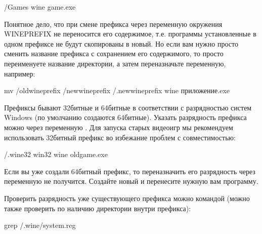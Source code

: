 \documentclass[letterpaper,10pt,russian,openany]{sphinxmanual}
\begin{document}
\begin{sphinxVerbatim}[commandchars=\\\{\}]
\PYGZti{}/Games wine game.exe 
\end{sphinxVerbatim}

\sphinxAtStartPar
Понятное дело, что при смене префикса через переменную окружения WINEPREFIX не переносится его содержимое,
т.е. программы установленные в одном префиксе не будут скопированы в новый.
Но если вам нужно просто сменить название префикса с сохранением его содержимого,
то просто переименуете название директории, а затем переназначьте переменную, например:

\begin{sphinxVerbatim}[commandchars=\\\{\}]
mv \PYGZti{}/old\PYGZus{}wineprefix \PYGZti{}/new\PYGZus{}wineprefix
\PYGZti{}/.new\PYGZus{}wineprefix wine приложение.exe
\end{sphinxVerbatim}

\sphinxAtStartPar
Префиксы бывают 32\sphinxhyphen{}битные и 64\sphinxhyphen{}битные в соответствии с разрядностью систем Windows (по умолчанию создаются 64\sphinxhyphen{}битные).
Указать разрядность префикса можно через переменную .
Для запуска старых видеоигр мы рекомендуем использовать 32\sphinxhyphen{}битный префикс во избежание проблем с совместимостью:

\begin{sphinxVerbatim}[commandchars=\\\{\}]
\PYGZti{}/.wine32 win32 wine oldgame.exe
\end{sphinxVerbatim}

\sphinxAtStartPar
Если вы уже создали 64\sphinxhyphen{}битный префикс, то переназначить его разрядность через переменную  не получится. Создайте новый и перенесите нужную вам программу.

\sphinxAtStartPar
Проверить разрядность уже существующего префикса можно командой (можно также проверить по наличию директории  внутри префикса):

\begin{sphinxVerbatim}[commandchars=\\\{\}]
grep  \PYGZti{}/.wine/system.reg
\end{sphinxVerbatim}
\end{document}
